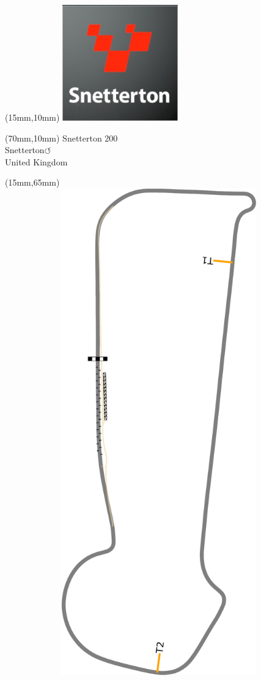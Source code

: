 \null\newpage
\begin{textblock*}{50mm}(15mm,10mm)%
\includegraphics[width=50mm]{LG/2015-05-20_00095.png}
\end{textblock*}
\begin{textblock*}{130mm}(70mm,10mm)%
{\fontsize{20}{20}\selectfont Snetterton 200\\}
{\fontsize{16}{16}\selectfont Snetterton\hfill \huge$\circlearrowleft$\\}
{\fontsize{12}{12}\selectfont United Kingdom\\}
\end{textblock*}
\begin{textblock*}{185mm}(15mm,65mm)%
\centering
\mbox{\includegraphics[width=185mm,height=210mm,keepaspectratio]{PT/SN200.pdf}}
\end{textblock*}
